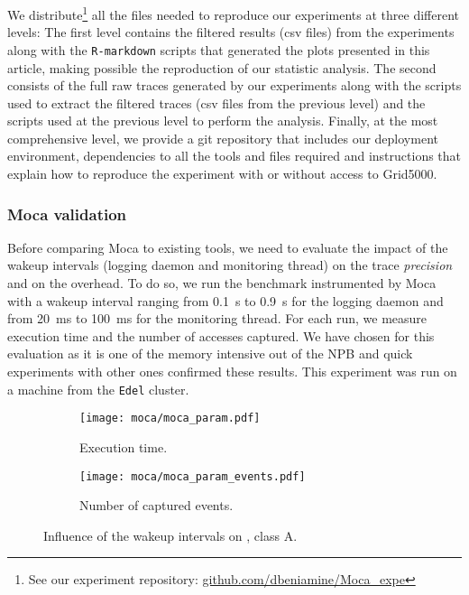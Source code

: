 We distribute\footnote{
    See our experiment repository:
    \href{https://github.com/dbeniamine/Moca_expe}{github.com/dbeniamine/Moca\_expe}
} all the files needed to reproduce our experiments at three different levels:
The first level contains the filtered results (csv files) from the experiments along with the \texttt{R-markdown} scripts that generated the plots presented in this article, making possible the reproduction of our statistic analysis.
The second consists of the full raw traces generated by our experiments along with the scripts used to extract the filtered traces (csv files from the previous level) and the scripts used at the previous level to perform the analysis.
Finally, at the most comprehensive level, we provide a git repository that includes our deployment environment, dependencies to all the tools and files required and instructions that explain how to reproduce the experiment with or without access to \gls{Grid5000}.


\subsubsection{Moca validation}
\label{sec:expe-param}

Before comparing \gls{Moca} to existing tools, we need to evaluate the impact of the wakeup intervals (logging daemon and monitoring thread) on the trace \emph{precision} and on the overhead.
To do so, we run the \IS benchmark instrumented by \gls{Moca} with a wakeup interval ranging from \SI{0.1}{s} to  \SI{0.9}{s} for the logging daemon and from \SI{20}{ms} to \SI{100}{ms} for the monitoring thread.
For each run, we measure \IS execution time and the number of accesses captured.
We have chosen \IS for this evaluation as it is one of the memory intensive out of the \gls{NPB} and quick experiments with other ones confirmed these results.
This experiment was run on a machine from the \texttt{Edel} cluster.

\begin{figure}[htb]
    \centering
    \begin{subfigure}{.7\linewidth}
        \texttt{[image: moca/moca\_param.pdf]}
        \caption{Execution time.}
        \label{fig:param_time}
    \end{subfigure}
    \begin{subfigure}{.7\linewidth}
        \texttt{[image: moca/moca\_param\_events.pdf]}
        \caption{Number of captured events.}
        \label{fig:param_evts}
    \end{subfigure}
    \caption[Influence of Moca wakeup intervals.]{Influence of the wakeup intervals on \IS, class A.}
    \label{fig:param}
\end{figure}

